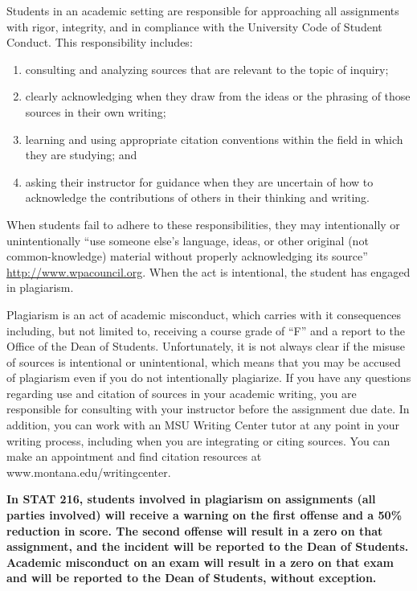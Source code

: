 \documentclass[
]{article}
\providecommand{\tightlist}{%
  \setlength{\itemsep}{0pt}\setlength{\parskip}{0pt}}
\begin{document}
Students in an academic setting are responsible for approaching all
assignments with rigor, integrity, and in compliance with the University
Code of Student Conduct. This responsibility includes:

\begin{enumerate}
\def\labelenumi{\arabic{enumi}.}
\tightlist
\item
  consulting and analyzing sources that are relevant to the topic of
  inquiry;
\item
  clearly acknowledging when they draw from the ideas or the phrasing of
  those sources in their own writing;
\item
  learning and using appropriate citation conventions within the field
  in which they are studying; and
\item
  asking their instructor for guidance when they are uncertain of how to
  acknowledge the contributions of others in their thinking and writing.
\end{enumerate}

When students fail to adhere to these responsibilities, they may
intentionally or unintentionally ``use someone else's language, ideas,
or other original (not common-knowledge) material without properly
acknowledging its source'' \url{http://www.wpacouncil.org}. When the act
is intentional, the student has engaged in plagiarism.

Plagiarism is an act of academic misconduct, which carries with it
consequences including, but not limited to, receiving a course grade of
``F'' and a report to the Office of the Dean of Students. Unfortunately,
it is not always clear if the misuse of sources is intentional or
unintentional, which means that you may be accused of plagiarism even if
you do not intentionally plagiarize. If you have any questions regarding
use and citation of sources in your academic writing, you are
responsible for consulting with your instructor before the assignment
due date. In addition, you can work with an MSU Writing Center tutor at
any point in your writing process, including when you are integrating or
citing sources. You can make an appointment and find citation resources
at www.montana.edu/writingcenter.

\textbf{In STAT 216, students involved in plagiarism on assignments (all
parties involved) will receive a warning on the first offense and a 50\%
reduction in score. The second offense will result in a zero on that
assignment, and the incident will be reported to the Dean of Students.
Academic misconduct on an exam will result in a zero on that exam and
will be reported to the Dean of Students, without exception.}
\end{document}
